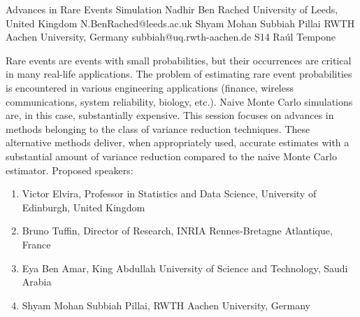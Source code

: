 

\clearpage

\begin{session}
 {Advances in Rare Events Simulation}%
 {Nadhir Ben Rached}%
 {University of Leeds, United Kingdom}%
 {N.BenRached@leeds.ac.uk}%
 {Shyam Mohan Subbiah Pillai}%
 {RWTH Aachen University, Germany}%
 {subbiah@uq.rwth-aachen.de}%
 {S14}%
 {Ra\'ul Tempone}%

 Rare events are events with small probabilities, but their occurrences are critical in many real-life applications. The problem of estimating rare event probabilities is encountered in various engineering applications (finance, wireless communications, system reliability, biology, etc.). Naive Monte Carlo simulations are, in this case, substantially expensive. This session focuses on advances in methods belonging to the class of variance reduction techniques.  These alternative methods deliver, when appropriately used, accurate estimates with a substantial amount of variance reduction compared to the naive Monte Carlo estimator.
 Proposed speakers:
 \begin{enumerate}
 \item Victor Elvira, Professor in Statistics and Data Science, University of Edinburgh, United Kingdom
 \item Bruno Tuffin, Director of Research, INRIA Rennes-Bretagne Atlantique, France
 \item Eya Ben Amar, King Abdullah University of Science and Technology, Saudi Arabia
 \item Shyam Mohan Subbiah Pillai, RWTH Aachen University, Germany
 \end{enumerate}
 \medskip
\end{session}



\clearpage

